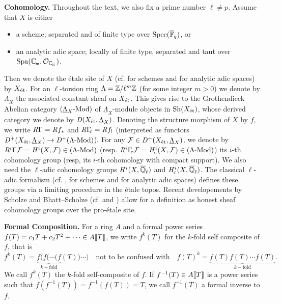 \documentclass[../main.tex]{subfiles}
\begin{document}
\textbf{Cohomology.} 
Throughout the text, we also fix a prime number $\ell \neq p$.
Assume that $X$ is either 
\begin{itemize}
  \item a scheme; separated and of finite type over $\operatorname{Spec}({\overline {\mathbb{F}}_q})$, or
  \item an analytic adic space; locally of finite type, separated and taut over
    $\spa(\Cp, \cO_\Cp)$. 
\end{itemize}
Then we denote the \'etale site of $X$ (cf. \cite{LeiFuEtale} for schemes and
\cite{huber2013etale} for analytic adic spaces) by $X_{\textnormal{\'et}}$. For an
$\ell$-torsion ring $\Lambda = \mathbb{Z}/\ell^m \mathbb{Z}$ (for some integer $m>0$) we denote
by $\underline \Lambda_X$ the associated constant sheaf on $X_{\textnormal{\'et}}$. This gives
rise to the Grothendieck Abelian category ${({\underline \Lambda_X}\textnormal-\allowbreak\mathrm{Mod})}$ of
$\underline \Lambda_X$-module objects in $\mathrm{Sh}(X_{\textnormal{\'et}})$, whose derived category
we denote by $\mathit D(X_{\textnormal{\'et}}, \underline \Lambda_X)$. 
Denoting the structure morphism of $X$ by $f$, we write 
$\mathit R \Gamma = \mathit R f_*$ and $\mathit R \Gamma_{\hspace{-2pt}\mathrm{c}} = \mathit R f_!$ (interpreted as functors
$\mathit D^+(X_{\textnormal{\'et}}, \underline \Lambda_X) \to \mathit D^+{({\Lambda}\textnormal-\allowbreak\mathrm{Mod})}$).
For any $\mathcal{F} \in \mathit D^+(X_{\textnormal{\'et}}, \underline \Lambda_X)$, we denote 
by $\mathit R^i\Gamma\mathcal{F} = \mathit H^i(X, \mathcal{F}) \in {({\Lambda}\textnormal-\allowbreak\mathrm{Mod})}$ (resp. $\mathit R^i \Gamma_{\hspace{-2pt}\mathrm{c}} \mathcal{F} = 
\mathit H_{\mathrm{c}}^i(X, \mathcal{F}) \in {({\Lambda}\textnormal-\allowbreak\mathrm{Mod})}$) its $i$-th cohomology group (resp, its
$i$-th cohomology with compact support).
We also need the $\ell$-adic cohomology groups $\mathit H^i(X, {\overline {\mathbb{Q}}_\ell})$ 
and $\mathit H_{\mathrm{c}}^i(X, {\overline {\mathbb{Q}}_\ell})$. The classical $\ell$-adic formalism (cf. \cite{LeiFuEtale},
\cite{jannsen1988continuous} for schemes and \cite{huber1998comparison} for
analytic adic spaces) defines these groups via a limiting procedure in the 
\'etale topos. Recent developements by Scholze and Bhatt--Scholze (cf.
\cite{scholze2017etale} and \cite{bhattscholze2013pro}) allow for a definition
as honest sheaf cohomology groups over the pro-\'etale site.

\textbf{Formal Composition.}
For a ring $A$ and a formal power series $f(T) = c_1 T + c_2 T^2 + \dots \in
A\llbracket T \rrbracket$, we write $f^k(T)$ for the $k$-fold self composite of $f$, that is
\begin{equation*}
  f^k(T) = \underbrace{f(f( \cdots (f}_{k-\text{fold}}(T)) \cdots) \quad \text{not to be confused with}
  \quad f(T)^k = \underbrace{f(T) f(T) \cdots f(T)}_{k-\text{fold}}.
\end{equation*}
We call $f^k(T)$ the $k$-fold self-composite of $f$. If $f^{-1}(T) \in A\llbracket T \rrbracket$
is a power series such that $f(f^{-1}(T)) = f^{-1}(f(T)) = T$, we call
$f^{-1}(T)$ a formal inverse to $f$.
\end{document}
